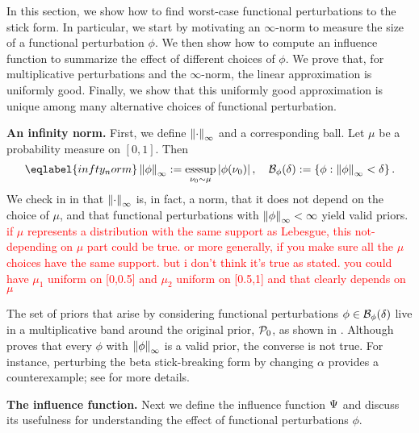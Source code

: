 In this section, we show how to find worst-case functional perturbations to the stick form. In particular, we start by motivating an $\infty$-norm to measure the size of a functional perturbation $\phi$. We then show how to compute an influence function to summarize the effect of different choices of $\phi$. We prove that, for multiplicative perturbations and the $\infty$-norm, the linear approximation is uniformly good. Finally, we show that this uniformly good approximation is unique among many alternative choices of functional perturbation.

\noindent \textbf{An infinity norm.}
First, we define $\left\Vert\cdot\right\Vert_{\infty}$ and a corresponding ball.
Let $\mu$ be a probability measure on $[0,1]$. Then
\begin{equation} \eqlabel{infty_norm}
	\norminf{\phi} := \esssup_{\nu_0 \sim \mu} \abs{\phi(\nu_0)},
	\quad \ball_\phi(\delta) := \left\{ \phi: \norminf{\phi} <
\delta \right\}.
\end{equation}
We check in  in  that $\left\Vert\cdot\right\Vert_{\infty}$ is, in fact, a norm, that it does not depend on the choice of $\mu$, and that functional perturbations with $\left\Vert\phi\right\Vert_{\infty} < \infty$ yield valid priors.  \textcolor{red}{if $\mu$ represents a distribution with the same support as Lebesgue, this not-depending on $\mu$ part could be true. or more generally, if you make sure all the $\mu$ choices have the same support. but i don't think it's true as stated. you could have $\mu_1$ uniform on [0,0.5] and $\mu_2$ uniform on [0.5,1] and that clearly depends on $\mu$}

The set of priors that arise by considering functional perturbations $\phi \in
\mathcal{B}_\phi(\delta)$ live in a multiplicative band around the original
prior, $\mathcal{P}_{0}$, as shown in . Although
 proves that every $\phi$ with $\left\Vert\phi\right\Vert_{\infty}$ is a
valid prior, the converse is not true. For instance, perturbing the beta stick-breaking form
by changing $\alpha$ provides a counterexample; see  for more details.

\FunctionBallFig{}

\noindent \textbf{The influence function.}
Next we define the influence function $\Psi$ and discuss its usefulness for understanding the effect of functional perturbations $\phi$.

